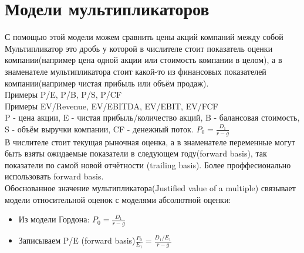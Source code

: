 \documentclass{article}
\begin{document}
\section{Модели мультипликаторов}
С помощью этой модели можем сравнить цены акций компаний между собой\\
Мультипликатор это дробь у которой в числителе стоит показатель оценки компании(например цена одной акции или стоимость компании в целом), а в знаменателе мультипликатора стоит какой-то из финансовых показателей компании(например чистая прибыль или объём продаж).\\
Примеры  P/E, P/B, P/S, P/CF \\
Примеры  EV/Revenue, EV/EBITDA, EV/EBIT, EV/FCF\\
P - цена акции, E - чистая прибыль/количество акций, B - балансовая стоимость, S - объём выручки компании, CF - денежный поток.
$P_0 = \frac{D_1}{r - g}$\\
В числителе стоит текущая рыночная оценка, а в знаменателе переменные могут быть взяты ожидаемые показатели в следующем году(forward basis), так показатели по самой новой отчётности (trailing basis). Более проффесионально использовать forward basis.\\
Обоснованное значение мультипликатора(Justified value of a multiple) связывает модели относительной оценок с моделями абсолютной оценки:\\ 
\begin{itemize}
\item Из модели Гордона: $P_0 = \frac{D_1}{r - g}$\\
\item Записываем P/E (forward basis)$\frac{P_0}{E_1} = \frac{D_1/E_1}{r - g}$\\
\end{itemize}
\end{document}
